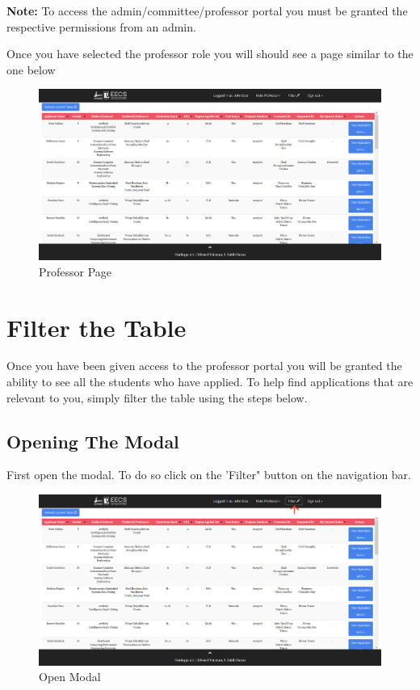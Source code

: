 \documentclass[fontsize=12pt,paper=letter,twoside]{scrartcl}
\begin{document}
\noindent \textbf{Note:} To access the admin/committee/professor portal you must be granted the respective permissions from an admin.

\clearpage

Once you have selected the professor role you will should see a page similar to the one below

\begin{figure}[!htb]
\begin{center}
\includegraphics[width=.99\textwidth]{images/professor.png}
\end{center}
\caption{Professor Page}
\label{fig:professor}
\end{figure}

\clearpage

\section{Filter the Table}
Once you have been given access to the professor portal you will be granted the ability to see all the students who have applied. To help find applications that are relevant to you, simply filter the table using the steps below.

\subsection{Opening The Modal}
First open the modal. To do so click on the 'Filter" button on the navigation bar.

\begin{figure}[!htb]
\begin{center}
\includegraphics[width=.99\textwidth]{images/open_modal.png}
\end{center}
\caption{Open Modal}
\label{fig:open_modal}
\end{figure}
\end{document}

